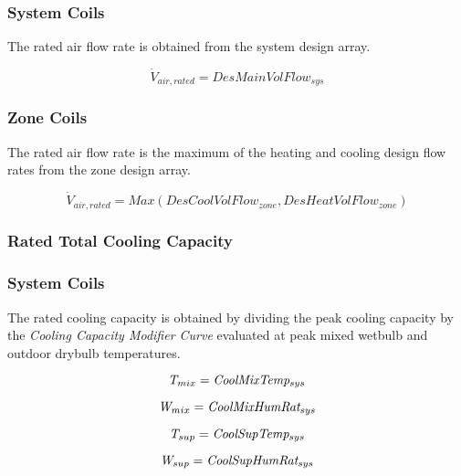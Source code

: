 \subsubsection{System Coils}\label{system-coils-4}

The rated air flow rate is obtained from the system design array.

\begin{equation}
\dot V_{air,rated} = DesMainVolFlow_{sys}
\end{equation}

\subsubsection{Zone Coils}\label{zone-coils-4}

The rated air flow rate is the maximum of the heating and cooling design flow rates from the zone design array.

\begin{equation}
\dot V_{air,rated} = Max(DesCoolVolFlow_{zone},DesHeatVolFlow_{zone})
\end{equation}

\subsubsection{Rated Total Cooling Capacity}\label{rated-total-cooling-capacity-2}

\subsubsection{System Coils}\label{system-coils-5}

The rated cooling capacity is obtained by dividing the peak cooling capacity by the \emph{Cooling Capacity Modifier Curve} evaluated at peak mixed wetbulb and outdoor drybulb temperatures.

\begin{equation}
\emph{T\(_{mix}\)} = \emph{CoolMixTemp\(_{sys}\)}
\end{equation}

\begin{equation}
\emph{W\(_{mix}\)} = \emph{CoolMixHumRat\(_{sys}\)}
\end{equation}

\begin{equation}
\emph{T\(_{sup}\)} = \emph{CoolSupTemp\(_{sys}\)}
\end{equation}

\begin{equation}
\emph{W\(_{sup}\)} = \emph{CoolSupHumRat\(_{sys}\)}
\end{equation}

